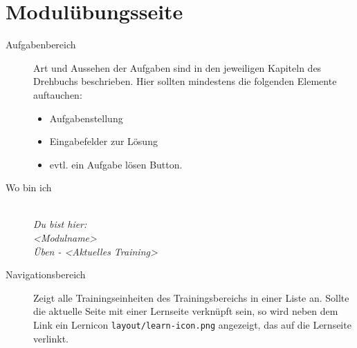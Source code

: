 %
%
%
\section{Modulübungsseite}
\label{sec:module-training-page}

\begin{description}
  \item[Aufgabenbereich] Art und Aussehen der Aufgaben sind in den jeweiligen Kapiteln des Drehbuchs beschrieben. Hier sollten mindestens die folgenden Elemente auftauchen:
  \begin{itemize}
    \item Aufgabenstellung
    \item Eingabefelder zur Lösung
    \item evtl. ein Aufgabe lösen Button.
  \end{itemize}
  \item[Wo bin ich] \emph{\\Du bist hier:\\<Modulname>\\Üben - <Aktuelles Training>}
  \item[Navigationsbereich] Zeigt alle Trainingseinheiten des Trainingsbereichs in einer Liste an. 
	Sollte die aktuelle Seite mit einer Lernseite verknüpft sein, so wird neben dem Link ein Lernicon \texttt{layout/learn-icon.png} angezeigt, das auf die Lernseite verlinkt.
\end{description}



\endinput 
